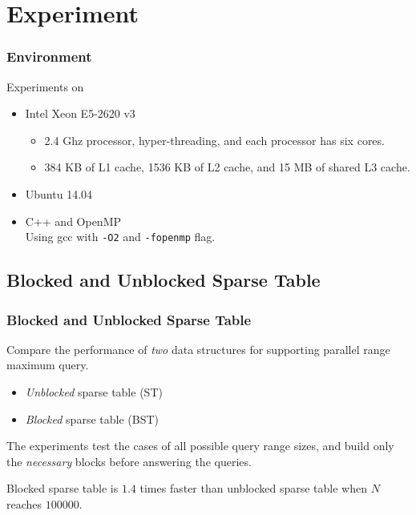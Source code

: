 \section{Experiment}

\begin{frame}
	\frametitle{Environment}
	Experiments on 
	\begin{itemize}
		\setlength\itemsep{1em}
		\item
			Intel Xeon E5-2620 v3
			\begin{itemize}
				\setlength\itemsep{1em}
				\item
					2.4 Ghz processor, hyper-threading, and each
					processor has six cores.
				\item
					384 KB of L1 cache, 1536 KB of L2 cache, and 15 MB
					of shared L3 cache.
			\end{itemize}
		\item 
			Ubuntu 14.04
		\item
			C++ and OpenMP \\
			Using gcc with {\tt -O2} and {\tt -fopenmp} flag.
	\end{itemize}
\end{frame}

\subsection{Blocked and Unblocked Sparse Table}
\begin{frame}
    \frametitle{Blocked and Unblocked Sparse Table}
    Compare the performance of {\em two} data structures for supporting
	parallel range maximum query.

	\begin{itemize}
		\item 
			{\em Unblocked} sparse table ({\sc ST})
		\item 
			{\em Blocked} sparse table ({\sc BST})
	\end{itemize}
	\vspace{1em}
	The experiments test the cases of all possible query range sizes,
	and build only the {\em necessary} blocks before answering the
	queries.
\end{frame}

\begin{frame}
	Blocked sparse table is $1.4$ times faster than unblocked sparse
	table when $N$ reaches $100000$.
	\begin{center}
	\scalebox{0.65} { \begin{minipage}{1.53\textwidth}
			
			\end{minipage}
		}
	\end{center}
\end{frame}

